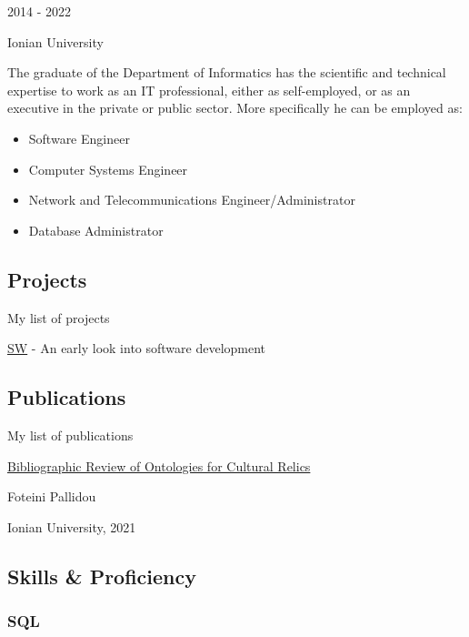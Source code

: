 \documentclass[english,]{article}
\providecommand{\tightlist}{%
  \setlength{\itemsep}{0pt}\setlength{\parskip}{0pt}}
\begin{document}
2014 - 2022

Ionian University

The graduate of the Department of Informatics has the scientific and
technical expertise to work as an IT professional, either as
self-employed, or as an executive in the private or public sector. More
specifically he can be employed as:

\begin{itemize}
\tightlist
\item
  Software Engineer
\item
  Computer Systems Engineer
\item
  Network and Telecommunications Engineer/Administrator
\item
  Database Administrator
\end{itemize}

\hypertarget{projects}{%
\subsection{\texorpdfstring{{ \emph{} \emph{} }
Projects}{    Projects}}\label{projects}}

My list of projects

{ \href{https://github.com/p14pall/sw}{SW} } - {An early look into
software development}

\hypertarget{publications}{%
\subsection{\texorpdfstring{{ \emph{} \emph{} }
Publications}{    Publications}}\label{publications}}

My list of publications

\protect\hyperlink{}{Bibliographic Review of Ontologies for Cultural
Relics}

Foteini Pallidou

Ionian University, 2021

\hypertarget{skills-proficiency}{%
\subsection{\texorpdfstring{{ \emph{} \emph{} } Skills \&
Proficiency}{    Skills \& Proficiency}}\label{skills-proficiency}}

\hypertarget{sql}{%
\subsubsection{SQL}\label{sql}}
\end{document}
